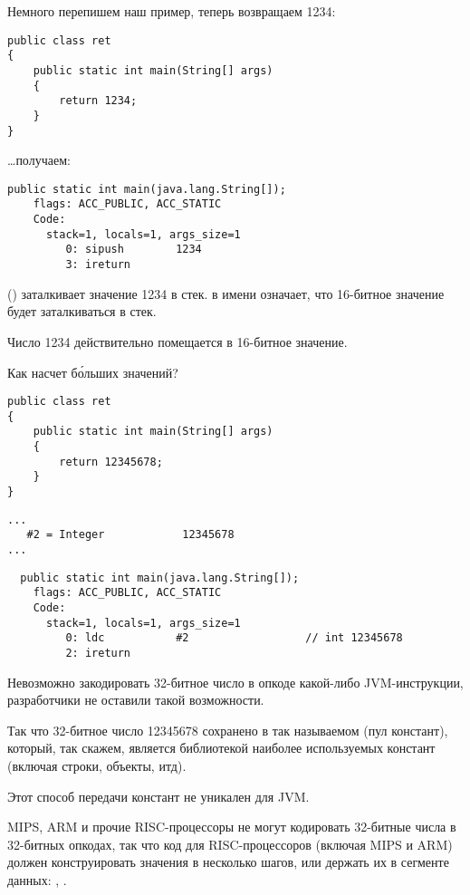 Немного перепишем наш пример, теперь возвращаем 1234:

\begin{lstlisting}
public class ret
{
	public static int main(String[] args)
	{
		return 1234;
	}
}
\end{lstlisting}

\dots получаем:

\begin{lstlisting}[caption=JDK 1.7 (excerpt)]
  public static int main(java.lang.String[]);
    flags: ACC_PUBLIC, ACC_STATIC
    Code:
      stack=1, locals=1, args_size=1
         0: sipush        1234
         3: ireturn       
\end{lstlisting}

 () заталкивает значение 1234 в стек.
 в имени означает, что 16-битное значение будет заталкиваться в стек. 

Число 1234 действительно помещается в 16-битное значение.

Как насчет б\'{о}льших значений?

\begin{lstlisting}
public class ret
{
	public static int main(String[] args) 
	{
		return 12345678;
	}
}
\end{lstlisting}

\begin{lstlisting}[caption=Constant pool]
...
   #2 = Integer            12345678
...
\end{lstlisting}

\begin{lstlisting}
  public static int main(java.lang.String[]);
    flags: ACC_PUBLIC, ACC_STATIC
    Code:
      stack=1, locals=1, args_size=1
         0: ldc           #2                  // int 12345678
         2: ireturn       
\end{lstlisting}

Невозможно закодировать 32-битное число в опкоде какой-либо JVM-инструкции, 
разработчики не оставили такой возможности.

Так что 32-битное число 12345678 сохранено в так называемом  (пул констант),
который, так скажем, является библиотекой наиболее используемых констант (включая строки, объекты,
итд).

Этот способ передачи констант не уникален для JVM.

MIPS, ARM и прочие RISC-процессоры не могут кодировать 32-битные числа в 32-битных опкодах,
так что код для RISC-процессоров (включая MIPS и ARM) должен конструировать значения 
в несколько шагов, или держать их в сегменте данных:
, .

